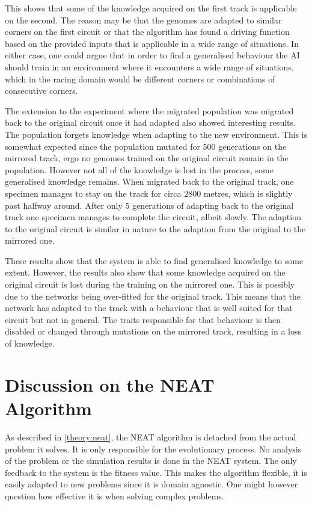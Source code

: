 This shows that some of the knowledge acquired on the first track is applicable on the second. The reason may be that the genomes are adapted to similar corners on the first circuit or that the algorithm has found a driving function based on the provided inputs that is applicable in a wide range of situations. In either case, one could argue that in order to find a generalised behaviour the AI should train in an environment where it encounters a wide range of situations, which in the racing domain would be different corners or combinations of consecutive corners. 

The extension to the experiment where the migrated population was migrated back to the original circuit once it had adapted also showed interesting results. The population forgets knowledge when adapting to the new environment. This is somewhat expected since the population mutated for 500 generations on the mirrored track, ergo no genomes trained on the original circuit remain in the population. However not all of the knowledge is lost in the process, some generalised knowledge remains. When migrated back to the original track, one specimen manages to stay on the track for circa $2800$ metres, which is slightly past halfway around. After only $5$ generations of adapting back to the original track one specimen manages to complete the circuit, albeit slowly. The adaption to the original circuit is similar in nature to the adaption from the original to the mirrored one. 

These results show that the system is able to find generalised knowledge to some extent. However, the results also show that some knowledge acquired on the original circuit is lost during the training on the mirrored one. This is possibly due to the networks being over-fitted for the original track. This means that the network has adapted to the track with a behaviour that is well suited for that circuit but not in general. The traits responsible for that behaviour is then disabled or changed through mutations on the mirrored track, resulting in a loss of knowledge.

\section{Discussion on the NEAT Algorithm}
\label{discussion:neat_mechanism}
As described in \ref{theory:neat}, the NEAT algorithm is detached from the actual problem it solves. It is only responsible for the evolutionary process. No analysis of the problem or the simulation results is done in the NEAT system. The only feedback to the system is the fitness value. This makes the algorithm flexible, it is easily adapted to new problems since it is domain agnostic. One might however question how effective it is when solving complex problems.  

